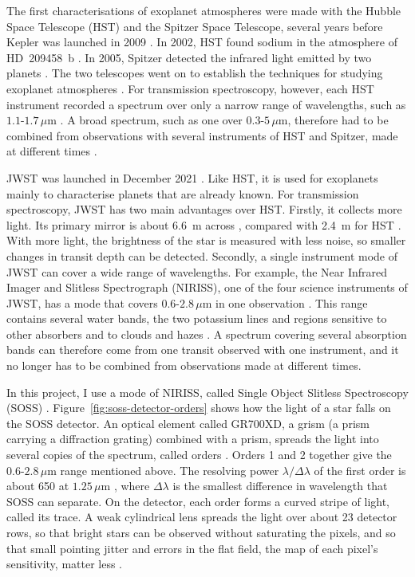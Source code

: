 The first characterisations of exoplanet atmospheres were made with the Hubble
Space Telescope (HST) and the Spitzer Space Telescope, several years before
Kepler was launched in 2009 \citep{BoruckiEtAl2010}. In 2002, HST found
sodium in the atmosphere of HD~209458~b \citep{CharbonneauEtAl2002}. In 2005, Spitzer detected the infrared light emitted by two planets
\citep{DemingEtAl2005,CharbonneauEtAl2005}. The two telescopes went on to
establish the techniques for studying exoplanet atmospheres
\citep{KnutsonEtAl2007,SingEtAl2016}. For transmission spectroscopy, however,
each HST instrument recorded a spectrum over only a narrow range of
wavelengths, such as $1.1$-$1.7\,\mu\mathrm{m}$ \citep{SingEtAl2016}. A broad
spectrum, such as one over $0.3$-$5\,\mu\mathrm{m}$, therefore had to be
combined from observations with several instruments of HST and Spitzer, made
at different times \citep{SingEtAl2016,AldersonEtAl2022}.

JWST was launched in December 2021 \citep{RigbyEtAl2023}. Like HST, it is used for exoplanets mainly to
characterise planets that are already known. For transmission spectroscopy,
JWST has two main advantages over HST. Firstly, it collects more light. Its
primary mirror is about 6.6~m across \citep{GardnerEtAl2006,RigbyEtAl2023},
compared with 2.4~m for HST \citep{NASAHubbleDesign2026}. With more light, the
brightness of the star is measured with less noise, so smaller changes in
transit depth can be detected. Secondly, a single instrument mode of JWST can
cover a wide range of wavelengths. For example, the Near Infrared Imager and
Slitless Spectrograph (NIRISS), one of the four science instruments of JWST,
has a mode that covers $0.6$-$2.8\,\mu\mathrm{m}$ in one observation
\citep{AlbertEtAl2023}. This range contains several water bands, the two
potassium lines and regions sensitive to other absorbers and to clouds and
hazes \citep{AlbertEtAl2023,HolmbergMadhusudhan2023,LouieEtAl2025}. A spectrum covering several absorption bands can therefore come from one transit observed with one instrument,
and it no longer has to be combined from observations made at different
times.

In this project, I use a mode of NIRISS, called Single Object Slitless
Spectroscopy (SOSS) \citep{AlbertEtAl2023}.
Figure~\ref{fig:soss-detector-orders} shows how the light of a star falls on
the SOSS detector. An optical element called GR700XD, a grism (a prism carrying a diffraction grating) combined with a prism, spreads the light into several copies of the spectrum, called orders
\citep{AlbertEtAl2023}. Orders 1 and 2 together give the
$0.6$-$2.8\,\mu\mathrm{m}$ range mentioned above. The resolving power
$\lambda/\Delta\lambda$ of the first order is about 650 at
$1.25\,\mu\mathrm{m}$ \citep{AlbertEtAl2023}, where $\Delta\lambda$ is the
smallest difference in wavelength that SOSS can separate. On the detector,
each order forms a curved stripe of light, called its trace. A weak
cylindrical lens spreads the light over about 23 detector rows, so that bright stars can be observed without saturating the pixels, and so that small pointing jitter and errors in the flat field, the map of each pixel's sensitivity, matter less \citep{AlbertEtAl2023,JDoxNIRISSSOSS2026}.

